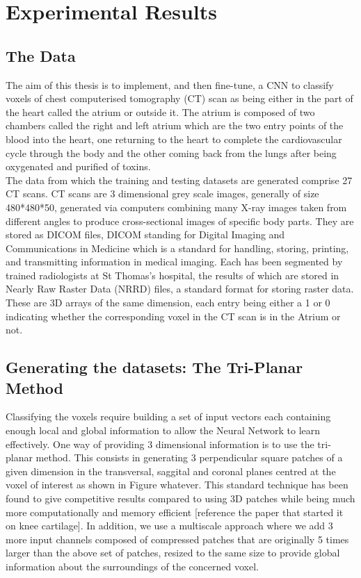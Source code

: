 \chapter{Experimental Results}

\section{The Data}

\noindent The aim of this thesis is to implement, and then fine-tune, a CNN to classify voxels of chest computerised tomography (CT) scan as being either in the part of the heart called the atrium or outside it. The atrium is composed of two chambers called the right and left atrium which are the two entry points of the blood into the heart, one returning to the heart to complete the cardiovascular cycle through the body and the other coming back from the lungs after being oxygenated and purified of toxins.\\

\noindent The data from which the training and testing datasets are generated comprise 27 CT scans. CT scans are 3 dimensional grey scale images, generally of size 480*480*50, generated via computers combining many X-ray images taken from different angles to produce cross-sectional images of specific body parts. They are stored as DICOM files, DICOM standing for Digital Imaging and Communications in Medicine which is a standard for handling, storing, printing, and transmitting information in medical imaging. Each has been segmented by trained radiologists at St Thomas's hospital, the results of which are stored in Nearly Raw Raster Data (NRRD) files, a standard format for storing raster data. These are 3D arrays of the same dimension, each entry being either a 1 or 0 indicating whether the corresponding voxel in the CT scan is in the Atrium or not. 

\section{Generating the datasets: The Tri-Planar Method}

\noindent Classifying the voxels require building a set of input vectors each containing enough local and global information to allow the Neural Network to learn effectively. One way of providing 3 dimensional information is to use the tri-planar method. This consists in generating 3 perpendicular square patches of a given dimension in the transversal, saggital and coronal planes centred at the voxel of interest as shown in Figure whatever. This standard technique has been found to give competitive results compared to using 3D patches while being much more computationally and memory efficient [reference the paper that started it on knee cartilage]. In addition, we use a multiscale approach where we add 3 more input channels composed of compressed patches that are originally 5 times larger than the above set of patches, resized to the same size to provide global information about the surroundings of the concerned voxel.\\

